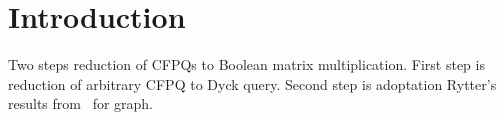 \section{Introduction}

Two steps reduction of CFPQs to Boolean matrix multiplication.
First step is reduction of arbitrary CFPQ to Dyck query.
Second step is adoptation Rytter's results from~\cite{Rytter} for graph.